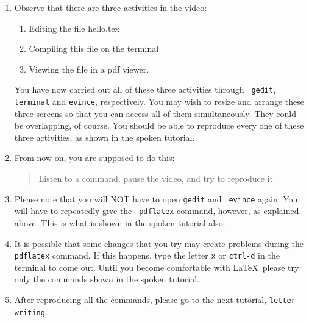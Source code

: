 \documentclass[11pt]{article}
\newenvironment{enumcpt}{\begin{enumerate} \topsep 0pt \partopsep 0pt 
                        \parsep 0pt
                        \itemsep 0pt \leftmargin -1in \rightmargin 0pt
                        }{\end{enumerate}}
\begin{document}
\begin{multicols}{2}
\begin{enumcpt}
\item Observe that there are three activities in the video:
  \begin{enumcpt}
  \item Editing the file hello.tex
  \item Compiling this file on the terminal
  \item Viewing the file in a pdf viewer.
  \end{enumcpt}
  You have now carried out all of these three activities through {\tt
    gedit}, {\tt terminal} and {\tt evince}, respectively.  You may
  wish to resize and arrange these three screens so that you can
  access all of them simultaneously.  They could be overlapping, of
  course.  You should be able to reproduce every one of these three
  activities, as shown in the spoken tutorial.
\item From now on, you are supposed to do this: 
\begin{quote}
Listen to a command, pause the video, and try to reproduce it
\end{quote}
\item Please note that you will NOT have to open {\tt gedit} and {\tt
    evince} again.  You will have to repeatedly give the {\tt
    pdflatex} command, however, as explained above.  This is what is
  shown in the spoken tutorial also.
\item It is possible that some changes that you try may create
  problems during the {\tt pdflatex} command.  If this happens, type
  the letter {\tt x} or {\tt ctrl-d} in the terminal to come out.
  Until you become comfortable with \LaTeX\, please try only the
  commands shown in the spoken tutorial.
\item After reproducing all the commands, please go to the next
  tutorial, {\tt letter writing}.
\end{enumcpt}


\end{multicols}
\end{document}
